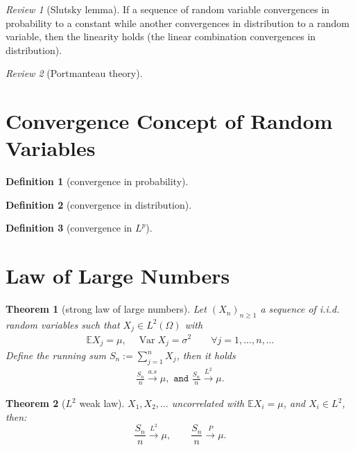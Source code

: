 \documentclass[a4paper,11pt]{book}
\newtheorem{theorem}{Theorem}[section]
\theoremstyle{definition}
\newtheorem{definition}{Definition}[section]
\theoremstyle{remark}
\newtheorem{review}{Review}
\DeclareMathOperator{\var}{Var}
\begin{document}
\begin{review}[Slutsky lemma]
If a sequence of random variable convergences in probability to a constant while another convergences in distribution to a random variable, then the linearity holds (the linear combination convergences in distribution).
\end{review}

\begin{review}[Portmanteau theory]
\end{review}

\section{Convergence Concept of Random Variables}
\begin{definition}[convergence in probability]
\end{definition}

\begin{definition}[convergence in distribution]
\end{definition}

\begin{definition}[convergence in $L^p$]
\end{definition}



\section{Law of Large Numbers}
\begin{theorem}[strong law of large numbers]
	Let $(X_n)_{n \ge 1}$ a sequence of i.i.d. random variables such that $X_j \in L^2(\Omega)$ with 
	\begin{align*}
		\mathbb{E}X_j = \mu, \quad \var X_j = \sigma^2 \qquad \forall j = 1, \dots, n, \dots 
	\end{align*}
	Define the running sum $S_n := \sum_{j = 1}^n X_j$, then it holds
	\begin{align*}
		\frac{S_n}{n} \overset{a.s}{\longrightarrow} \mu, \texttt{ and } \frac{S_n}{n} \overset{L^2}{\longrightarrow} \mu. 
	\end{align*}
\end{theorem}


\begin{theorem}[$L^2$ weak law]
	$X_1, X_2, \dots$ uncorrelated with $\mathbb{E}X_i = \mu$, and $X_i \in L^2$, then:
	\begin{equation*}
		\frac{S_n}{n} \overset{L^2}{\longrightarrow}\mu, \qquad \frac{S_n}{n} \overset{P}{\longrightarrow} \mu.
	\end{equation*}
\end{theorem}
\end{document}
